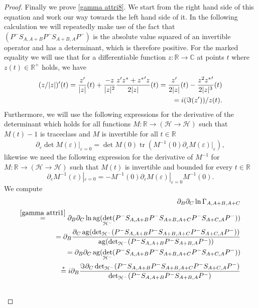 \documentclass[b5paper,draft,openbib,12pt]{memoir}
\DeclareMathOperator{\tr}{tr}
\DeclareMathOperator{\ag}{ag}
\begin{document}
\begin{proof}
Finally we prove \eqref{gamma attri8}. We start from the right hand side of this equation 
and work our way towards the left hand side of it. In the following calculation we will repeatedly make use of the fact that 
\((P^-S_{A,A+B}P^-S_{A+B,A}P^- )\) is the absolute value squared of an invertible operator and has a determinant, which is therefore positive. 
For the marked equality we will use that for a differentiable function \(z:\mathbb{R}\rightarrow \mathbb{C}\) at points \(t\) where \(z(t)\in\mathbb{R}^+\)
holds, we have
\begin{align}\notag
(z/|z|)'(t)=\frac{z'}{|z|}(t)+\frac{-z}{|z|^2}\frac{z'z^*+ {z^*}'z}{2|z|}(t) =\frac{z'}{2|z|}(t)-\frac{z^2{z^*}'}{2 |z|^3}(t)\\
=i (\Im (z'))/z(t).
\end{align}
Furthermore, we will use the following  expressions for the derivative of the determinant which holds for all functions 
\(M:\mathbb{R}\rightarrow (\mathcal{H}\rightarrow \mathcal{H})\) such that \(M(t)-1\) is traceclass and \(M\) is invertible 
for all \(t\in\mathbb{R}\)
\begin{align}\label{diff det}
\partial_\varepsilon \det M(\varepsilon)|_{\varepsilon=0}=\det M(0) \tr (M^{-1}(0)\partial_\varepsilon M(\varepsilon)|_{\varepsilon}),
\end{align}
likewise we need the following expression for the derivative of \(M^{-1}\) for 
\(M:\mathbb{R}\rightarrow (\mathcal{H}\rightarrow \mathcal{H})\) such that \(M(t)\) is invertible and bounded for every \(t\in\mathbb{R}\)
\begin{equation}
\partial_{\varepsilon}M^{-1}(\varepsilon)|_{\varepsilon=0}=-M^{-1}(0) \partial_{\varepsilon}M(\varepsilon)|_{\varepsilon=0}M^{-1}(0).
\end{equation}
We compute
\begin{align}
\partial_B \partial_C \ln \Gamma_{A,A+B,A+C}\\
\overset{\eqref{gamma attri1}}{=} 
\partial_B \partial_C \ln \ag(\det_{\mathcal{H}^-} (P^-S_{A,A+B}P^-S_{A+B,A+C}P^- S_{A+C,A}P^-))\\
=\partial_B \frac{\partial_C\ag(\det_{\mathcal{H}^-}(P^-S_{A,A+B}P^-S_{A+B,A+C}P^- S_{A+C,A}P^-))}{\ag(\det_{\mathcal{H}^-} (P^-S_{A,A+B}P^-S_{A+B,A}P^- ))}\\
=\partial_B \partial_C\ag(\det_{\mathcal{H}^-}(P^-S_{A,A+B}P^-S_{A+B,A+C}P^- S_{A+C,A}P^-))\\
\overset{*}{=}
i\partial_B \frac{\Im \partial_C \det_{\mathcal{H}^-}(P^-S_{A,A+B}P^-S_{A+B,A+C}P^- S_{A+C,A}P^-)}{\det_{\mathcal{H}^-}(P^-S_{A,A+B}P^-S_{A+B,A}P^-)}\\\notag

\end{align}
\end{proof}
\end{document}
